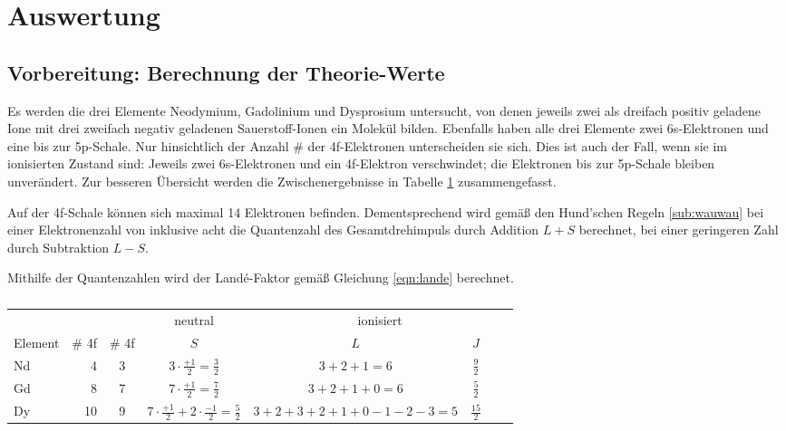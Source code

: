 \section{Auswertung}
\label{sec:Auswertung}

\subsection{Vorbereitung: Berechnung der Theorie-Werte}

Es werden die drei Elemente Neodymium, Gadolinium und Dysprosium untersucht, von denen jeweils zwei als dreifach positiv geladene 
Ione mit drei zweifach negativ geladenen Sauerstoff-Ionen ein Molekül bilden. 
Ebenfalls haben alle drei Elemente zwei 6s-Elektronen und eine bis zur 5p-Schale. Nur hinsichtlich der Anzahl # der 4f-Elektronen unterscheiden sie sich. 
Dies ist auch der Fall, wenn sie im ionisierten Zustand sind: 
Jeweils zwei 6s-Elektronen und ein 4f-Elektron verschwindet; die Elektronen bis zur 5p-Schale bleiben unverändert. 
Zur besseren Übersicht werden die Zwischenergebnisse in Tabelle \ref{tab:Theo} zusammengefasst. 

Auf der 4f-Schale können sich maximal 14 Elektronen befinden. Dementsprechend wird gemäß den Hund'schen Regeln \ref{sub:wauwau} bei einer Elektronenzahl von inklusive acht 
die Quantenzahl des Gesamtdrehimpuls durch Addition $L+S$ berechnet, bei einer geringeren Zahl durch Subtraktion $L-S$. 

Mithilfe der Quantenzahlen wird der Landé-Faktor gemäß Gleichung \eqref{eqn:lande} berechnet. 

    \begin{table}
        \centering
        \caption{}
        \label{tab:Theo}
        \begin{tabular}{l r c c c c}
            \toprule
            & & & 
            neutral & 
            \multicolumn{4}{c}{ionisiert} \\
            \cmidrule(lr){4} \cmidrule(lr){5-8}
            Element &
            # 4f & 
            # 4f &
            $S$ & 
            $L$ & 
            $J$ \\
            \midrule
            Nd &  4 & 3 & $3\cdot\frac{+1}{2}=\frac{3}{2}$                       & $3+2+1=6$             & $\frac{9}{2}$  \\
            Gd &  8 & 7 & $7\cdot\frac{+1}{2}=\frac{7}{2}$                       & $3+2+1+0=6$           & $\frac{5}{2}$  \\
            Dy & 10 & 9 & $7\cdot\frac{+1}{2}+2\cdot\frac{-1}{2}=\frac{5}{2}$    & $3+2+3+2+1+0-1-2-3=5$ & $\frac{15}{2}$ \\
            \bottomrule
        \end{tabular}
    \end{table}

